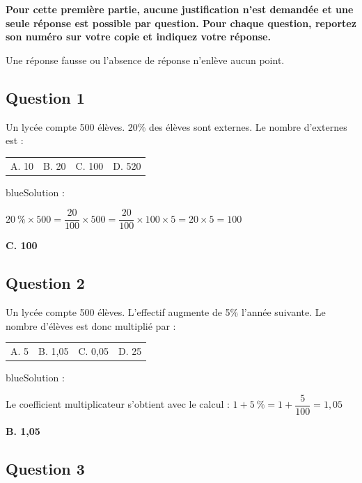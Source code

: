 \textbf{Pour cette première partie, aucune justification n'est demandée et une seule réponse est possible par question. Pour chaque question, reportez son numéro sur votre copie et indiquez votre réponse.}\par
Une réponse fausse ou l'absence de réponse n'enlève aucun point.

\vspace{.8em}

\subsection*{Question 1}

Un lycée compte 500 élèves. 20\% des élèves sont externes. Le nombre d'externes est :
\begin{center}
\begin{tabularx}{.92\linewidth}{XXXX} A. 10 & B. 20 & C. 100 & D. 520\end{tabularx}\end{center}

\begin{color}{blue}Solution :\par
$20~\%\times 500 = \dfrac{20}{100}\times 500 = \dfrac{20}{100}\times 100 \times 5 = 20 \times 5 = 100$

\textbf{C. 100}
\end{color}

\subsection*{Question 2}

Un lycée compte 500 élèves. L'effectif augmente de 5\% l'année suivante. Le nombre d'élèves est donc multiplié par :
\begin{center}
\begin{tabularx}{.92\linewidth}{XXXX} A. 5 & B. 1,05 & C. 0,05 & D. 25\end{tabularx}
\end{center}

\begin{color}{blue}Solution :\par

Le coefficient multiplicateur s'obtient avec le calcul : $1+5~\% = 1 + \dfrac{5}{100} = 1,05$

\textbf{B. 1,05}
\end{color}

\subsection*{Question 3}

